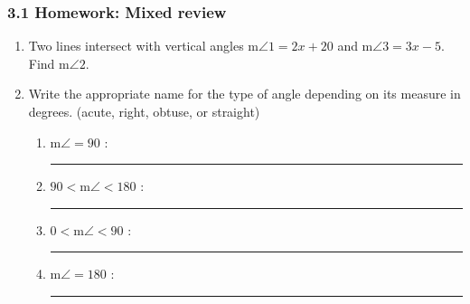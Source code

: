 

\fancyhead[LE]{\thepage}



\subsubsection*{3.1 Homework: Mixed review}
\begin{enumerate}
\item Two lines intersect with vertical angles m$\angle 1=2x+20$ and m$\angle 3=3x-5$. Find m$\angle 2$.
  \begin{flushleft}
  \end{flushleft}

\item Write the appropriate name for the type of angle depending on its measure in degrees. (acute, right, obtuse, or straight)
    \begin{enumerate}
      \item m$\angle = 90$ : \rule{4cm}{0.15mm} \bigskip
      \item $90 < \text{m}\angle < 180$ : \rule{4cm}{0.15mm} \bigskip
      \item $0< \text{m}\angle < 90$ : \rule{4cm}{0.15mm} \bigskip
      \item m$\angle = 180$ : \rule{4cm}{0.15mm} \bigskip
    \end{enumerate}


\end{enumerate}
